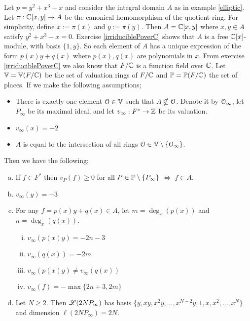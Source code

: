 \begin{example} \label{ellipticRR}
	Let $p = y^2 + x^3 - x$ and consider the integral domain
	$A$ as in example
	\ref{elliptic}. Let $\pi : \mathbb{C}[x,y] \to A$ be the 
	canonical homomorphism of the quotient ring.
	For simplicity, define $x := \pi(x)$ and $y := \pi(y)$. 
	Then $A = \mathbb{C} [x,y]$ where $x,y \in A$ satisfy $y^2+x^3-x=0$.
	Exercise \ref{irriduciblePoverC} shows that 
	$A$ is a free $\mathbb{C}[x]$-module, with basis $\{ 1, y \}$. 
	So each element of $A$ has a unique expression of the form
	$p(x)y + q(x)$ where $p(x), q(x)$ are polynomials in $x$. 
	From exercise \ref{irriduciblePoverC} we also know that $F/\mathbb{C}$ 
	is a function field over $\mathbb{C}$. Let $\mathbb{V} = \mathbb{V}( F/ \mathbb{C} )$ 
	be the set of valuation rings of $F/ \mathbb{C}$ 
	and $\mathbb{P} = \mathbb{P}( F/ \mathbb{C} )$ the set of places. 
	If we make the following assumptions;
	\begin{itemize}
		\item There is exactly one element $\EuScript{O} \in \mathbb{V}$ such that
		$A \nsubseteq \EuScript{O}$. Denote it by $\EuScript{O}_\infty$,
		let $P_\infty$ be its maximal ideal, and let
		$v_\infty : F^* \to \mathbb{Z}$ be its valuation.
		\item $v_\infty(x) = -2$
		\item \label{Aisintersection}$A$ is equal to the intersection
		 of all rings $\EuScript{O} \in \mathbb{V} \setminus \{ \EuScript{O}_\infty \}$.
	\end{itemize}
	Then we have the following;
	\begin{enumerate}[(a)]
		\item If $f \in F^*$ then $v_P(f) \ge 0$ for all
		 $P \in \mathbb{P} \setminus \{ P_\infty \}$ $\iff$ $f \in A$.
		\item $v_\infty(y)=-3$
		\item For any $f = p(x)y + q(x) \in A$, let $m=\deg_x( p(x) )$ and $n = \deg_x( q(x) )$. 
		\begin{enumerate}[(i)]
			\item $v_\infty( p(x)y ) = -2n - 3$
			\item $v_\infty( q(x) ) = -2m$
			\item $v_\infty( p(x)y ) \neq  v_\infty( q(x) )$
			\item $v_\infty(f) = - \max \lbrace 2n + 3, 2m \rbrace $
		\end{enumerate}
		\item Let $N \ge 2$. Then $\mathscr{L}( 2N P_\infty )$ has basis 
		$\lbrace y, xy, x^2y,...,x^{N-2}y,1,x,x^2,...,x^N \rbrace $
		and dimension $\ell( 2N P_\infty ) = 2N$.
	\end{enumerate}
\end{example}

